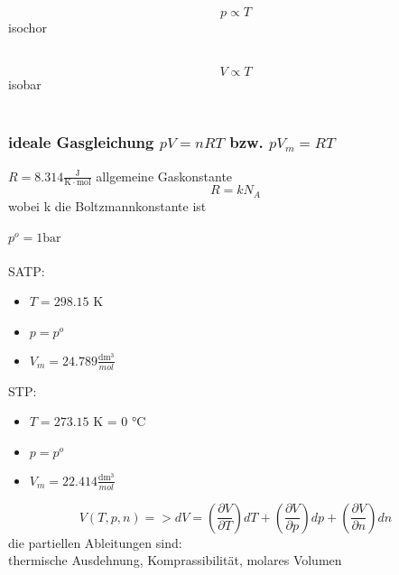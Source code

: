 \documentclass[a4paper]{article}
\begin{document}
\begin{equation*}
    p \varpropto T
\end{equation*}
isochor\newpage
{}\\
\begin{equation*}
    V \varpropto T
\end{equation*}
isobar\\\\
\subsubsection{ideale Gasgleichung $pV = nRT$ bzw. $pV_m = RT$}
$R = 8.314 \frac{\mathrm{J}}{\mathrm{K} \cdot \mathrm{mol}}$ allgemeine Gaskonstante\\
\begin{equation*}
    R = k N_A
\end{equation*}
wobei k die Boltzmannkonstante ist\\\\
$p^o = 1 \mathrm{bar}$\\\\
SATP:
\begin{itemize}
    \item $T=298.15$ K
    \item $p = p^o$
    \item $V_m = 24.789 \frac{\mathrm{dm^3}}{ mol}$
\end{itemize}
STP:
\begin{itemize}
    \item $T=273.15$ K = $0$ °C
    \item $p = p^o$
    \item $V_m = 22.414 \frac{\mathrm{dm^3}}{ mol}$
\end{itemize}
\begin{equation*}
    V(T,p,n) => dV=\left(\frac{\partial V}{\partial T}\right)dT+\left(\frac{\partial V}{\partial p}\right)dp+\left(\frac{\partial V}{\partial n}\right)dn
\end{equation*}
die partiellen Ableitungen sind:\\
thermische Ausdehnung, Komprassibilität, molares Volumen\\
\end{document}
